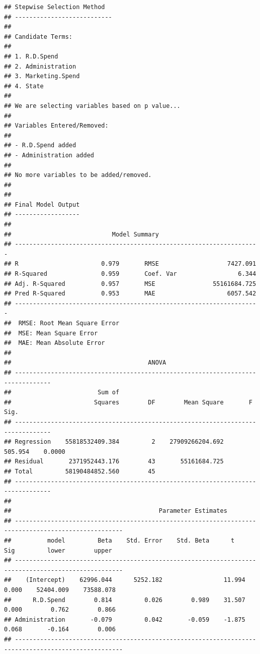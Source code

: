 \documentclass[]{book}
\begin{document}
\begin{verbatim}
## Stepwise Selection Method   
## ---------------------------
## 
## Candidate Terms: 
## 
## 1. R.D.Spend 
## 2. Administration 
## 3. Marketing.Spend 
## 4. State 
## 
## We are selecting variables based on p value...
## 
## Variables Entered/Removed: 
## 
## - R.D.Spend added 
## - Administration added 
## 
## No more variables to be added/removed.
## 
## 
## Final Model Output 
## ------------------
## 
##                            Model Summary                             
## --------------------------------------------------------------------
## R                       0.979       RMSE                   7427.091 
## R-Squared               0.959       Coef. Var                 6.344 
## Adj. R-Squared          0.957       MSE                55161684.725 
## Pred R-Squared          0.953       MAE                    6057.542 
## --------------------------------------------------------------------
##  RMSE: Root Mean Square Error 
##  MSE: Mean Square Error 
##  MAE: Mean Absolute Error 
## 
##                                      ANOVA                                       
## --------------------------------------------------------------------------------
##                        Sum of                                                   
##                       Squares        DF        Mean Square       F         Sig. 
## --------------------------------------------------------------------------------
## Regression    55818532409.384         2    27909266204.692    505.954    0.0000 
## Residual       2371952443.176        43       55161684.725                      
## Total         58190484852.560        45                                         
## --------------------------------------------------------------------------------
## 
##                                         Parameter Estimates                                          
## ----------------------------------------------------------------------------------------------------
##          model         Beta    Std. Error    Std. Beta      t        Sig         lower        upper 
## ----------------------------------------------------------------------------------------------------
##    (Intercept)    62996.044      5252.182                 11.994    0.000    52404.009    73588.078 
##      R.D.Spend        0.814         0.026        0.989    31.507    0.000        0.762        0.866 
## Administration       -0.079         0.042       -0.059    -1.875    0.068       -0.164        0.006 
## ----------------------------------------------------------------------------------------------------
\end{verbatim}
\end{document}
